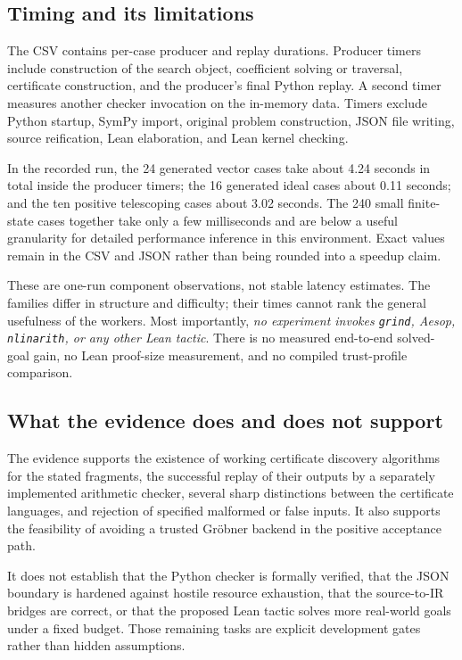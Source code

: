 \subsection{Timing and its limitations}

The CSV contains per-case producer and replay durations. Producer timers include construction of the search object, coefficient solving or traversal, certificate construction, and the producer's final Python replay. A second timer measures another checker invocation on the in-memory data. Timers exclude Python startup, SymPy import, original problem construction, JSON file writing, source reification, Lean elaboration, and Lean kernel checking.

In the recorded run, the 24 generated vector cases take about 4.24 seconds in total inside the producer timers; the 16 generated ideal cases about 0.11 seconds; and the ten positive telescoping cases about 3.02 seconds. The 240 small finite-state cases together take only a few milliseconds and are below a useful granularity for detailed performance inference in this environment. Exact values remain in the CSV and JSON rather than being rounded into a speedup claim.

These are one-run component observations, not stable latency estimates. The families differ in structure and difficulty; their times cannot rank the general usefulness of the workers. Most importantly, \emph{no experiment invokes \texttt{grind}, Aesop, \texttt{nlinarith}, or any other Lean tactic}. There is no measured end-to-end solved-goal gain, no Lean proof-size measurement, and no compiled trust-profile comparison.

\subsection{What the evidence does and does not support}

The evidence supports the existence of working certificate discovery algorithms for the stated fragments, the successful replay of their outputs by a separately implemented arithmetic checker, several sharp distinctions between the certificate languages, and rejection of specified malformed or false inputs. It also supports the feasibility of avoiding a trusted Gr\"obner backend in the positive acceptance path.

It does not establish that the Python checker is formally verified, that the JSON boundary is hardened against hostile resource exhaustion, that the source-to-IR bridges are correct, or that the proposed Lean tactic solves more real-world goals under a fixed budget. Those remaining tasks are explicit development gates rather than hidden assumptions.
